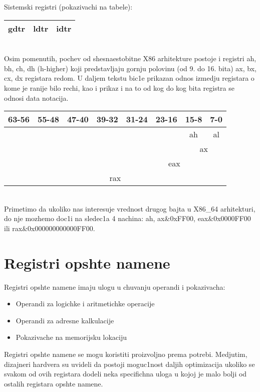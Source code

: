 \documentclass[a4paper,fleqn,12pt]{JMThesis}
\newcommand\eng{\fontencoding{OT1}\fontfamily{\rmdefault}\selectfont}
\begin{document}
Sistemski registri (pokazivachi na tabele):\\[1mm]
{\eng\begin{tabular}{|c|c|c|}
\hline
gdtr & ldtr & idtr \\
\hline
\end{tabular}}\\

Osim pomenutih, pochev od shesnaestobitne {\eng X86} arhitekture postoje i
registri {\eng ah, bh, ch, dh (h-higher)} koji predstavljaju gornju polovinu
(od 9. do 16. bita) {\eng ax, bx, cx, dx} registara redom. U daljem tekstu
bic1e prikazan odnos izmedju registara o kome je ranije bilo rechi, kao i
prikaz i na to od kog do kog bita registra se odnosi data notacija.\\

{\eng\begin{tabular}{|c|c|c|c|c|c|c|c|}
63-56 & 55-48 & 47-40 & 39-32 & 31-24 & 23-16 & 15-8 & 7-0 \\
\hline
&&&&&& ah & al \\
\hline
&&&&&& \multicolumn{2}{|c|}{ax} \\
\hline
&&&& \multicolumn{4}{|c|}{eax} \\
\hline
\multicolumn{8}{|c|}{rax} \\
\hline
\end{tabular}}\\

Primetimo da ukoliko nas interesuje vrednost drugog bajta u {\eng X86\_64}
arhitekturi, do nje mozhemo doc1i na sledec1a 4 nachina:
{\eng ah, ax\&0xFF00, eax\&0x0000FF00} ili {\eng rax\&0x000000000000FF00}.


\section{Registri opshte namene}
\medskip

Registri opshte namene imaju ulogu u chuvanju operandi i pokazivacha:
\begin{itemize}
\item Operandi za logichke i aritmetichke operacije
\item Operandi za adresne kalkulacije
\item Pokazivache na memorijsku lokaciju
\end{itemize}

Registri opshte namene se mogu koristiti proizvoljno prema potrebi. Medjutim,
dizajneri hardvera su uvideli da postoji moguc1nost daljih optimizacija ukoliko
se svakom od ovih registara dodeli neka specifichna uloga u kojoj je malo bolji
od ostalih registara opshte namene.\\
\end{document}
